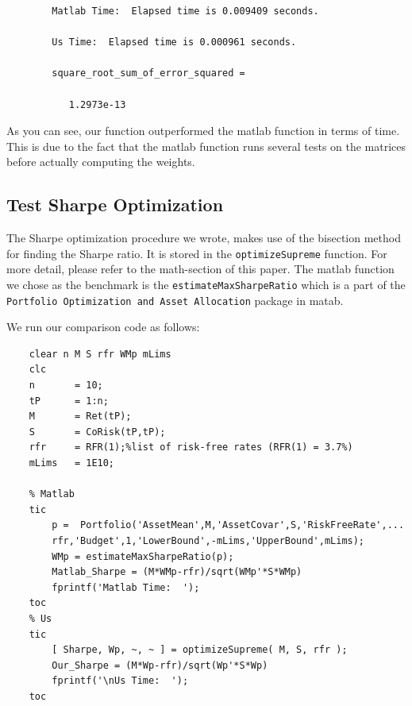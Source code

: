 \documentclass[12pt,titlepage,letter]{article}
\begin{document}
    \color{lightgray} \begin{lstlisting}
		Matlab Time:  Elapsed time is 0.009409 seconds.

		Us Time:  Elapsed time is 0.000961 seconds.

		square_root_sum_of_error_squared =

		   1.2973e-13

	\end{lstlisting} \color{black}
    \begin{par}
		As you can see, our function outperformed the matlab function in terms of time. This is due to the fact that the matlab function runs several tests on the matrices before actually computing the weights.
	\end{par} \vspace{1em}


	\subsection{Test Sharpe Optimization}

	\begin{par}
	The Sharpe optimization procedure we wrote, makes use of the bisection method for finding the Sharpe ratio. It is stored in the \texttt{optimizeSupreme} function. For more detail, please refer to the math-section of this paper. The matlab function we chose as the benchmark is the \texttt{estimateMaxSharpeRatio} which is a part of the \texttt{Portfolio Optimization and Asset Allocation} package in matab.
	\end{par} \vspace{1em}
	\begin{par}
	We run our comparison code as follows:
	\end{par} \vspace{1em}
	\begin{lstlisting}
	clear n M S rfr WMp mLims
	clc
	n       = 10;
	tP      = 1:n;
	M       = Ret(tP);
	S       = CoRisk(tP,tP);
	rfr     = RFR(1);%list of risk-free rates (RFR(1) = 3.7%)
	mLims   = 1E10;

	% Matlab
	tic
	    p =  Portfolio('AssetMean',M,'AssetCovar',S,'RiskFreeRate',...
	    rfr,'Budget',1,'LowerBound',-mLims,'UpperBound',mLims);
	    WMp = estimateMaxSharpeRatio(p);
	    Matlab_Sharpe = (M*WMp-rfr)/sqrt(WMp'*S*WMp)
	    fprintf('Matlab Time:  ');
	toc
	% Us
	tic
	    [ Sharpe, Wp, ~, ~ ] = optimizeSupreme( M, S, rfr );
	    Our_Sharpe = (M*Wp-rfr)/sqrt(Wp'*S*Wp)
	    fprintf('\nUs Time:  ');
	toc
	\end{lstlisting}
\end{document}
